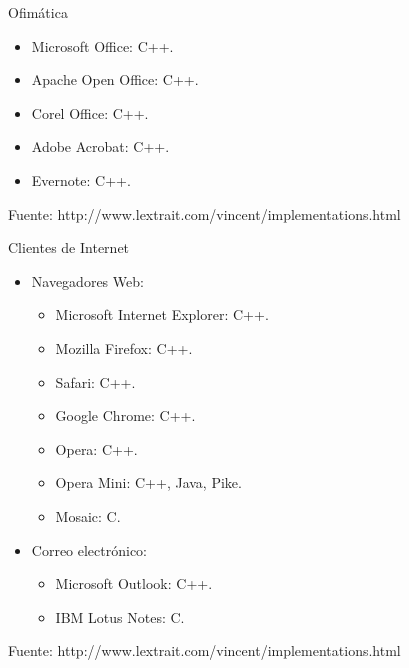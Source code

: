 \begin{frame}[t]{Ofimática}
  \begin{itemize}
    \item Microsoft Office: C++.
    \item Apache Open Office: C++.
    \item Corel Office: C++.
    \item Adobe Acrobat: C++.
    \item Evernote: C++.
  \end{itemize}
  \vfill
  {\tiny Fuente: http://www.lextrait.com/vincent/implementations.html}
\end{frame}

\begin{frame}[t]{Clientes de Internet}
  \begin{itemize}
    \item Navegadores Web:
      \begin{itemize}
        \item Microsoft Internet Explorer: C++.
        \item Mozilla Firefox: C++.
        \item Safari: C++.
        \item Google Chrome: C++.
        \item Opera: C++.
        \item Opera Mini: C++, Java, Pike.
        \item Mosaic: C.
      \end{itemize}
    \item Correo electrónico:
      \begin{itemize}
        \item Microsoft Outlook: C++.
        \item IBM Lotus Notes: C.
      \end{itemize}
    \end{itemize}
  \vfill
  {\tiny Fuente: http://www.lextrait.com/vincent/implementations.html}
\end{frame}

